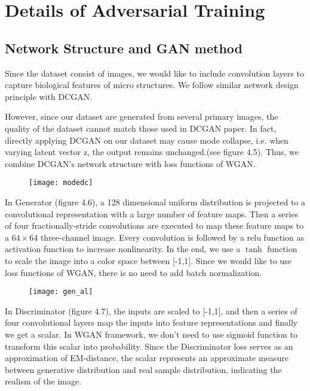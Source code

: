 \section{Details of Adversarial Training}

\subsection{Network Structure and GAN method}
Since the dataset consist of images, we would like to include convolution layers to capture biological features of micro structures. We follow similar network design principle with DCGAN.

However, since our dataset are generated from several primary images, the quality of the dataset cannot match those used in DCGAN paper. In fact, directly applying DCGAN on our dataset may cause mode collapse, i.e. when varying latent vector z, the output remains unchanged.(see figure 4.5). Thus, we combine DCGAN's network structure with loss functions of WGAN.
\begin{figure}
	\centering
	\texttt{[image: modedc]}
	\label{fig:13}
\end{figure}
In Generator (figure 4.6), a 128 dimensional uniform distribution is projected to a convolutional representation with a large number of feature maps. Then a series of four fractionally-stride convolutions are executed to map these feature maps to a $64\times64$ three-channel image. Every convolution is followed by a relu function as activation function to increase nonlinearity. In the end, we use a $\tanh$ function to scale the image into a color space between [-1,1]. Since we would like to use loss functions of WGAN, there is no need to add batch normalization.
\begin{figure}
	\centering
	\texttt{[image: gen\_al]}
	\label{fig:14}
\end{figure}

In Discriminator (figure 4.7), the inputs are scaled to [-1,1], and then a series of four convolutional layers map the inputs into feature representations and finally we get a scalar. In WGAN framework, we don't need to use sigmoid function to transform this scalar into probability. Since the Discriminator loss serves as an approximation of EM-distance, the scalar represents an approximate measure between generative distribution and real sample distribution, indicating the realism of the image.


